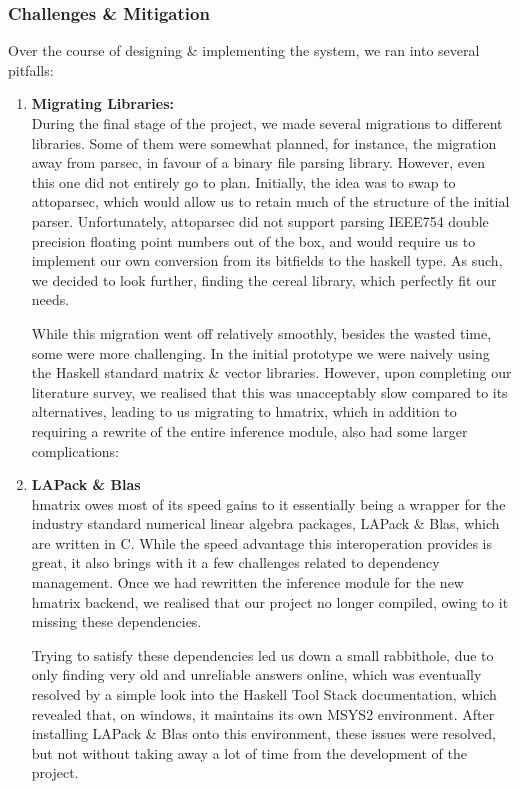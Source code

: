 \documentclass[12pt, titlepage]{article}
\begin{document}
\subsubsection{Challenges \& Mitigation}
Over the course of designing \& implementing the system, we ran into several pitfalls:
\begin{enumerate}
	\item \textbf{Migrating Libraries:}\\
	During the final stage of the project, we made several migrations to different libraries. Some of them were somewhat planned, for instance, the migration away from parsec, in favour of a binary file parsing library. However, even this one did not entirely go to plan. Initially, the idea was to swap to attoparsec, which would allow us to retain much of the structure of the initial parser. Unfortunately, attoparsec did not support parsing IEEE754 double precision floating point numbers out of the box, and would require us to implement our own conversion from its bitfields to the haskell type. As such, we decided to look further, finding the cereal library, which perfectly fit our needs.\bigskip

	While this migration went off relatively smoothly, besides the wasted time, some were more challenging. In the initial prototype we were naively using the Haskell standard matrix \& vector libraries. However, upon completing our literature survey, we realised that this was unacceptably slow compared to its alternatives, leading to us migrating to hmatrix, which in addition to requiring a rewrite of the entire inference module, also had some larger complications:

	\item \textbf{LAPack \& Blas}\\
	hmatrix owes most of its speed gains to it essentially being a wrapper for the industry standard numerical linear algebra packages, LAPack \& Blas, which are written in C. While the speed advantage this interoperation provides is great, it also brings with it a few challenges related to dependency management. Once we had rewritten the inference module for the new hmatrix backend, we realised that our project no longer compiled, owing to it missing these dependencies.\bigskip

	Trying to satisfy these dependencies led us down a small rabbithole, due to only finding very old and unreliable answers online, which was eventually resolved by a simple look into the Haskell Tool Stack documentation, which revealed that, on windows, it maintains its own MSYS2 environment. After installing LAPack \& Blas onto this environment, these issues were resolved, but not without taking away a lot of time from the development of the project.


\end{enumerate}
\end{document}
